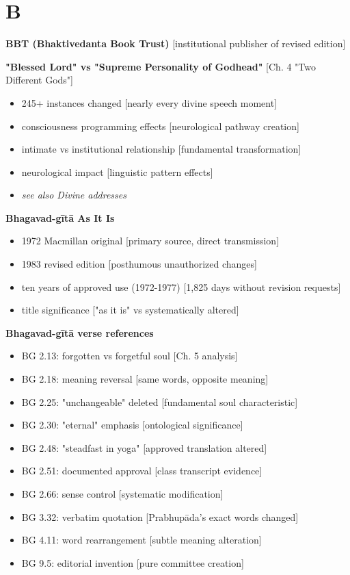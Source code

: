 \documentclass[11pt,twoside]{book}
\begin{document}
\section*{B}
\label{sec:orgb271551}

\textbf{\textbf{BBT (Bhaktivedanta Book Trust)}} {[}institutional publisher of revised edition]

\textbf{\textbf{"Blessed Lord" vs "Supreme Personality of Godhead"}} {[}Ch. 4 "Two Different Gods"]
\begin{itemize}
\item 245+ instances changed [nearly every divine speech moment]
\item consciousness programming effects [neurological pathway creation]
\item intimate vs institutional relationship [fundamental transformation]
\item neurological impact [linguistic pattern effects]
\item \emph{see also Divine addresses}
\end{itemize}

\textbf{\textbf{Bhagavad-gītā As It Is}}
\begin{itemize}
\item 1972 Macmillan original [primary source, direct transmission]
\item 1983 revised edition [posthumous unauthorized changes]
\item ten years of approved use (1972-1977) [1,825 days without revision requests]
\item title significance ["as it is" vs systematically altered]
\end{itemize}

\textbf{\textbf{Bhagavad-gītā verse references}}
\begin{itemize}
\item BG 2.13: forgotten vs forgetful soul [Ch. 5 analysis]
\item BG 2.18: meaning reversal [same words, opposite meaning]
\item BG 2.25: "unchangeable" deleted [fundamental soul characteristic]
\item BG 2.30: "eternal" emphasis [ontological significance]
\item BG 2.48: "steadfast in yoga" [approved translation altered]
\item BG 2.51: documented approval [class transcript evidence]
\item BG 2.66: sense control [systematic modification]
\item BG 3.32: verbatim quotation [Prabhupāda's exact words changed]
\item BG 4.11: word rearrangement [subtle meaning alteration]
\item BG 9.5: editorial invention [pure committee creation]
\end{itemize}
\end{document}
